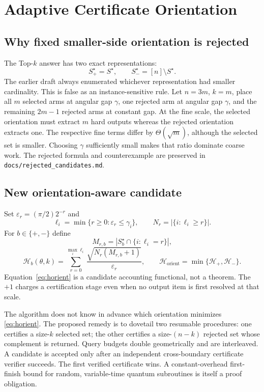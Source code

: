 \documentclass[10pt]{article}
\theoremstyle{definition}
\newcommand{\eps}{\varepsilon}
\begin{document}
\section{Adaptive Certificate Orientation}

\subsection{Why fixed smaller-side orientation is rejected}

The Top-$k$ answer has two exact representations:
\[
S_+^\star=S^\star,\qquad S_-^\star=[n]\setminus S^\star.
\]
The earlier draft always enumerated whichever representation had smaller
cardinality.  This is false as an instance-sensitive rule.  Let $n=3m$, $k=m$,
place all $m$ selected arms at angular gap $\gamma$, one rejected arm at angular
gap $\gamma$, and the remaining $2m-1$ rejected arms at constant gap.  At the
fine scale, the selected orientation must extract $m$ hard outputs whereas the
rejected orientation extracts one.  The respective fine terms differ by
$\Theta(\sqrt m)$, although the selected set is smaller.  Choosing $\gamma$
sufficiently small makes that ratio dominate coarse work.  The rejected formula
and counterexample are preserved in
\texttt{docs/rejected\_candidates.md}.

\subsection{New orientation-aware candidate}

Set $\eps_r=(\pi/2)2^{-r}$ and
\begin{equation}
\ell_i=\min\{r\ge0:\eps_r\le\gamma_i\},\qquad
N_r=|\{i:\ell_i\ge r\}|.
\end{equation}
For $b\in\{+,-\}$ define
\begin{equation}
M_{r,b}=|S_b^\star\cap\{i:\ell_i=r\}|,
\end{equation}
\begin{equation}
\mathcal H_b(\theta,k)
=\sum_{r=0}^{\max_i\ell_i}
\frac{\sqrt{N_r(M_{r,b}+1)}}{\eps_r},
\qquad
\mathcal H_{\mathrm{orient}}
=\min\{\mathcal H_+,\mathcal H_-\}.
\label{eq:horient}
\end{equation}
Equation~\eqref{eq:horient} is a candidate accounting functional, not a theorem.
The $+1$ charges a certification stage even when no output item is first resolved
at that scale.

The algorithm does not know in advance which orientation minimizes
\eqref{eq:horient}.  The proposed remedy is to dovetail two resumable procedures:
one certifies a size-$k$ selected set; the other certifies a size-$(n-k)$ rejected
set whose complement is returned.  Query budgets double geometrically and are
interleaved.  A candidate is accepted only after an independent cross-boundary
certificate verifier succeeds.  The first verified certificate wins.  A
constant-overhead first-finish bound for random, variable-time quantum
subroutines is itself a proof obligation.
\end{document}
